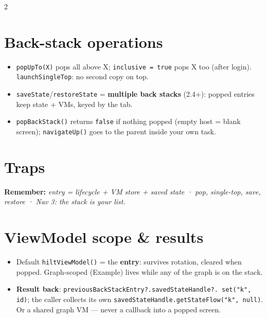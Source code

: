 \documentclass[8pt]{extarticle}
\newcommand\sq{\texttt{\hbox{?}\hbox{.}}}
\begin{document}
\begin{multicols}{2}
\section{Back-stack operations}
\begin{itemize}\raggedright
  \item \texttt{popUpTo(X)} pops all above X; \texttt{inclusive = true} pops X too (after
        login). \texttt{launchSingleTop}: no second copy on top.
  \item \texttt{saveState}/\texttt{restoreState} = \textbf{multiple back stacks} (2.4+): popped
        entries keep state + VMs, keyed by the tab.
  \item \texttt{popBackStack()} returns \texttt{false} if nothing popped (empty host = blank
        screen); \texttt{navigateUp()} goes to the parent inside your own task.
\end{itemize}

\section{Traps}
\begin{itemize}\raggedright
\end{itemize}

\textbf{Remember:} \emph{entry = lifecycle + VM store + saved state · pop, single-top, save,
restore · Nav 3: the stack is your list.}

\columnbreak

\section{ViewModel scope \& results}
\begin{itemize}\raggedright
  \item Default \texttt{hiltViewModel()} = the \textbf{entry}: survives rotation, cleared when
        popped. Graph-scoped (Example) lives while any of the graph is on the stack.
  \item \textbf{Result back}: \texttt{previousBackStackEntry\sq savedStateHandle\sq
        set("k", id)}; the caller collects its own \texttt{savedStateHandle.getStateFlow("k",
        null)}. Or a shared graph VM — never a callback into a popped screen.
\end{itemize}


\end{multicols}
\end{document}
